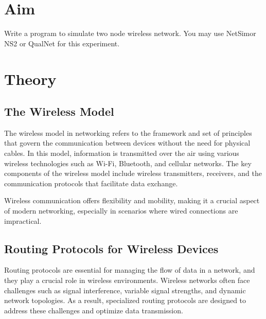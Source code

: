 \documentclass[11pt]{article}
\begin{document}
\tableofcontents
\thispagestyle{empty}
\clearpage

\setcounter{page}{1}

\section{Aim}
Write a program to simulate two node wireless network. You may use NetSimor NS2 or QualNet
for this experiment.

\section{Theory}

\subsection{The Wireless Model}

The wireless model in networking refers to the framework and set of principles that govern the communication between devices without the need for physical cables. In this model, information is transmitted over the air using various wireless technologies such as Wi-Fi, Bluetooth, and cellular networks. The key components of the wireless model include wireless transmitters, receivers, and the communication protocols that facilitate data exchange.

Wireless communication offers flexibility and mobility, making it a crucial aspect of modern networking, especially in scenarios where wired connections are impractical.


\subsection{Routing Protocols for Wireless Devices}

Routing protocols are essential for managing the flow of data in a network, and they play a crucial role in wireless environments. Wireless networks often face challenges such as signal interference, variable signal strengths, and dynamic network topologies. As a result, specialized routing protocols are designed to address these challenges and optimize data transmission.
\end{document}
